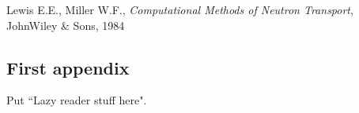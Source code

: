 \documentclass[11pt,letterpaper,notitlepage]{article}
\numberwithin{equation}{section}
\begin{document}
\newpage
\begin{thebibliography}{1}
	
	 Lewis E.E., Miller W.F., {\em Computational Methods of Neutron Transport}, JohnWiley \& Sons, 1984
	   
\end{thebibliography}

\newpage
\begin{appendices}
\section{First appendix}
Put ``Lazy reader stuff here".
\end{appendices}
\end{document}
